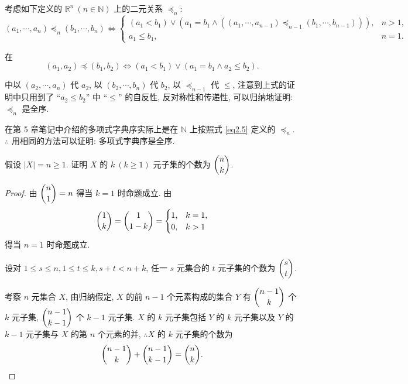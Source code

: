 \documentclass{ctexart}
\begin{document}
\begin{note}
    考虑如下定义的 $\mathbb{R}^n\ (n\in\mathbb{N})$ 上的二元关系 $\preceq_n$:
    \begin{equation}\label{eq2.5}
        (a_1,\cdots,a_n)\preceq_n(b_1,\cdots,b_n)\Leftrightarrow\begin{cases}
            (a_1<b_1)\vee(a_1=b_1\wedge((a_1,\cdots,a_{n-1})\preceq_{n-1}(b_1,\cdots,b_{n-1}))), & n>1, \\
            a_1\leq b_1, & n=1.
        \end{cases}
    \end{equation}

    在
    \[(a_1,a_2)\preceq(b_1,b_2)\Leftrightarrow(a_1<b_1)\vee(a_1=b_1\wedge a_2\leq b_2).\]

    中以 $(a_2,\cdots,a_n)$ 代 $a_2$, 以 $(b_2,\cdots,b_n)$ 代 $b_2$, 以 $\preceq_{n-1}$ 代 $\leq$, 注意到上式的证明中只用到了 ``$a_2\leq b_2$'' 中 ``$\leq$'' 的自反性, 反对称性和传递性, 可以归纳地证明: $\preceq_n$ 是全序.
    
    在第 5 章笔记中介绍的多项式字典序实际上是在 $\mathbb{N}$ 上按照式 \ref{eq2.5} 定义的 $\preceq_n$. $\therefore$ 用相同的方法可以证明: 多项式字典序是全序.
\end{note}
\begin{exercisec}[2.5.1(1)]
    假设 $|X|=n\geq1$. 证明 $X$ 的 $k\ (k\geq1)$ 元子集的个数为 $\dbinom{n}{k}$.
\end{exercisec}
\begin{proof}
    由 $\dbinom{n}{1}=n$ 得当 $k=1$ 时命题成立. 由
    \[\dbinom{1}{k}=\dbinom{1}{1-k}=\begin{cases}
        1, & k=1, \\
        0, & k>1
    \end{cases}\]
    得当 $n=1$ 时命题成立.

    设对 $1\leq s\leq n,1\leq t\leq k,s+t<n+k$, 任一 $s$ 元集合的 $t$ 元子集的个数为 $\dbinom{s}{t}$.
    
    考察 $n$ 元集合 $X$, 由归纳假定, $X$ 的前 $n-1$ 个元素构成的集合 $Y$ 有 $\dbinom{n-1}{k}$ 个 $k$ 元子集, $\dbinom{n-1}{k-1}$ 个 $k-1$ 元子集. $X$ 的 $k$ 元子集包括 $Y$ 的 $k$ 元子集以及 $Y$ 的 $k-1$ 元子集与 $X$ 的第 $n$ 个元素的并, $\therefore X$ 的 $k$ 元子集的个数为
    \[\dbinom{n-1}{k}+\dbinom{n-1}{k-1}=\dbinom{n}{k}.\qedhere\]
\end{proof}
\end{document}
